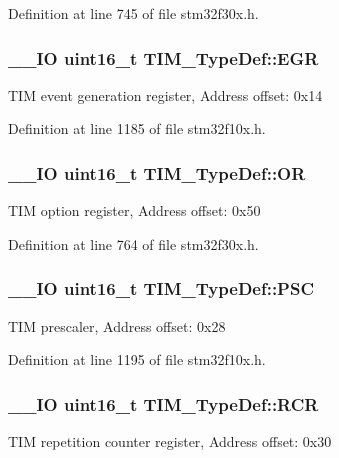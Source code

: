 Definition at line 745 of file stm32f30x.\-h.

\hypertarget{struct_t_i_m___type_def_a724fd21b7131fb9ac78c1b661dee3a8d}{
\subsubsection[{E\-G\-R}]{\setlength{\rightskip}{0pt plus 5cm}\-\_\-\-\_\-\-I\-O {\bf uint16\-\_\-t} T\-I\-M\-\_\-\-Type\-Def\-::\-E\-G\-R}}\label{struct_t_i_m___type_def_a724fd21b7131fb9ac78c1b661dee3a8d}
T\-I\-M event generation register, Address offset\-: 0x14 

Definition at line 1185 of file stm32f10x.\-h.

\hypertarget{struct_t_i_m___type_def_a145760563b46fcdeedddf7c92ee68d61}{
\subsubsection[{O\-R}]{\setlength{\rightskip}{0pt plus 5cm}\-\_\-\-\_\-\-I\-O {\bf uint16\-\_\-t} T\-I\-M\-\_\-\-Type\-Def\-::\-O\-R}}\label{struct_t_i_m___type_def_a145760563b46fcdeedddf7c92ee68d61}
T\-I\-M option register, Address offset\-: 0x50 

Definition at line 764 of file stm32f30x.\-h.

\hypertarget{struct_t_i_m___type_def_ad58e05db30d309608402a69d87c36505}{
\subsubsection[{P\-S\-C}]{\setlength{\rightskip}{0pt plus 5cm}\-\_\-\-\_\-\-I\-O {\bf uint16\-\_\-t} T\-I\-M\-\_\-\-Type\-Def\-::\-P\-S\-C}}\label{struct_t_i_m___type_def_ad58e05db30d309608402a69d87c36505}
T\-I\-M prescaler, Address offset\-: 0x28 

Definition at line 1195 of file stm32f10x.\-h.

\hypertarget{struct_t_i_m___type_def_aa6957ece6ee709031ab5241d6019fcce}{
\subsubsection[{R\-C\-R}]{\setlength{\rightskip}{0pt plus 5cm}\-\_\-\-\_\-\-I\-O {\bf uint16\-\_\-t} T\-I\-M\-\_\-\-Type\-Def\-::\-R\-C\-R}}\label{struct_t_i_m___type_def_aa6957ece6ee709031ab5241d6019fcce}
T\-I\-M repetition counter register, Address offset\-: 0x30 

